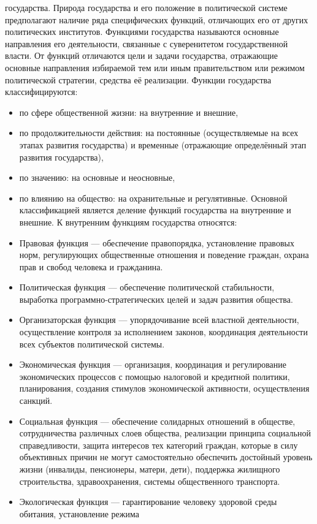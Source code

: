 \documentclass[12pt]{article}
\begin{document}
государства.
Природа государства и его положение в политической системе предполагают наличие ряда специфических
функций, отличающих его от других политических институтов. Функциями государства называются основные
направления его деятельности, связанные с суверенитетом государственной власти. От функций отличаются
цели и задачи государства, отражающие основные направления избираемой тем или иным правительством или
режимом политической стратегии, средства её реализации.
Функции государства классифицируются:
\begin{itemize}
  \item по сфере общественной жизни: на внутренние и внешние,
 \item по продолжительности действия: на постоянные (осуществляемые на всех этапах развития государства) и
временные (отражающие определённый этап развития государства),
\item по значению: на основные и неосновные,
\item по влиянию на общество: на охранительные и регулятивные.
Основной классификацией является деление функций государства на внутренние и внешние. К внутренним
функциям государства относятся:
\item Правовая функция — обеспечение правопорядка, установление правовых норм, регулирующих общественные
отношения и поведение граждан, охрана прав и свобод человека и гражданина.
\item Политическая функция — обеспечение политической стабильности, выработка программно-стратегических
целей и задач развития общества.
\item  Организаторская  функция  —  упорядочивание  всей  властной  деятельности,  осуществление  контроля  за
исполнением законов, координация деятельности всех субъектов политической системы.
\item Экономическая функция — организация, координация и регулирование экономических процессов с помощью
налоговой и кредитной политики, планирования, создания стимулов экономической активности, осуществления
санкций.
\item Социальная функция — обеспечение солидарных отношений в обществе, сотрудничества различных слоев
общества, реализации принципа социальной справедливости, защита интересов тех категорий граждан, которые
в  силу  объективных  причин  не  могут  самостоятельно  обеспечить  достойный  уровень  жизни  (инвалиды,
пенсионеры, матери, дети), поддержка жилищного строительства, здравоохранения, системы общественного
транспорта.
\item  Экологическая  функция  —  гарантирование  человеку  здоровой  среды  обитания,  установление  режима

\end{itemize}
\end{document}
